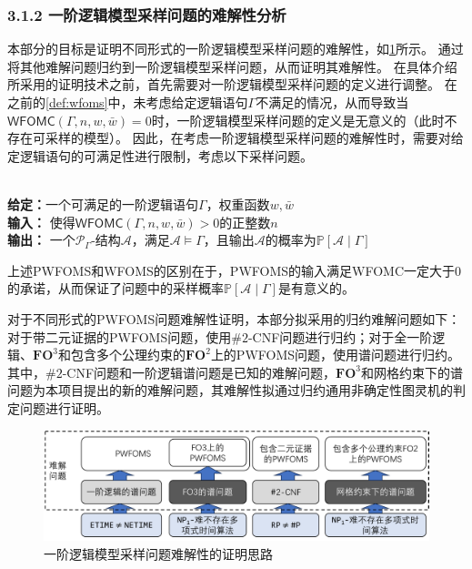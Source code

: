 \documentclass[12pt,UTF8,AutoFakeBold=3,a4paper]{ctexart} %
\newcommand{\sentence}{\Gamma}
\newcommand{\weight}{w}
\newcommand{\negweight}{\bar{w}}
\newcommand{\wfomc}{WFOMC}
\newcommand{\wfoms}{WFOMS}
\newcommand{\symwfomc}{\ensuremath{\mathsf{WFOMC}}}
\newcommand{\fotwo}{\ensuremath{\mathbf{FO}^2}}
\newcommand{\fothree}{\ensuremath{\mathbf{FO}^3}}
\newcommand{\pro}{\mathbb{P}}
\newcommand{\structure}{\mathcal{A}}
\begin{document}
\subsubsection{3.1.2 一阶逻辑模型采样问题的难解性分析}

本部分的目标是证明不同形式的一阶逻辑模型采样问题的难解性，如\cref{fig:hardness}所示。
通过将其他难解问题归约到一阶逻辑模型采样问题，从而证明其难解性。
在具体介绍所采用的证明技术之前，首先需要对一阶逻辑模型采样问题的定义进行调整。
在之前的\cref{def:wfoms}中，未考虑给定逻辑语句$\sentence$不满足的情况，从而导致当$\symwfomc(\sentence, n, \weight, \negweight) = 0$时，一阶逻辑模型采样问题的定义是无意义的（此时不存在可采样的模型）。
因此，在考虑一阶逻辑模型采样问题的难解性时，需要对给定逻辑语句的可满足性进行限制，考虑以下采样问题。

\begin{problem}\label{prob:sat_wfoms}
  \ \\
  \textbf{给定：}一个可满足的一阶逻辑语句$\sentence$，权重函数$\weight, \negweight$\\
  \textbf{输入：} 使得$\symwfomc(\sentence, n, \weight, \negweight) > 0$的正整数$n$
  \\\textbf{输出：} 一个$\mathcal{P}_\sentence$-结构$\structure$，满足$\structure\models\sentence$，且输出$\structure$的概率为$\pro[\structure\mid\sentence]$
\end{problem}
上述PWFOMS和\wfoms{}的区别在于，PWFOMS的输入满足\wfomc{}一定大于$0$的承诺，从而保证了问题中的采样概率$\pro[\structure\mid\sentence]$是有意义的。

对于不同形式的PWFOMS问题难解性证明，本部分拟采用的归约难解问题如下：对于带二元证据的PWFOMS问题，使用$\#2$-CNF问题进行归约；对于全一阶逻辑、\fothree{}和包含多个公理约束的\fotwo{}上的PWFOMS问题，使用谱问题进行归约。
其中，$\#2$-CNF问题和一阶逻辑谱问题是已知的难解问题，\fothree{}和网格约束下的谱问题为本项目提出的新的难解问题，其难解性拟通过归约通用非确定性图灵机的判定问题进行证明。

\begin{figure}[tbp]
  \centering
  \includegraphics[width=\textwidth]{figs/hardness.pdf}
  \caption{一阶逻辑模型采样问题难解性的证明思路}
  \label{fig:hardness}
\end{figure}
\end{document}
